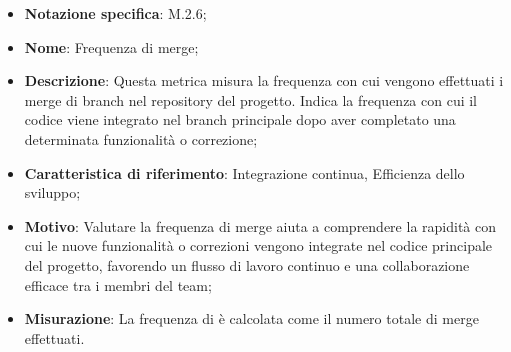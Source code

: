 \begin{itemize}
    \item \textbf{Notazione specifica}: M.2.6;
    \item \textbf{Nome}: Frequenza di merge;
    \item \textbf{Descrizione}: Questa metrica misura la frequenza con cui vengono effettuati i merge di branch nel repository del progetto. Indica la frequenza con cui il codice viene integrato nel branch principale dopo aver completato una determinata funzionalità o correzione;
    \item \textbf{Caratteristica di riferimento}: Integrazione continua, Efficienza dello sviluppo;
    \item \textbf{Motivo}: Valutare la frequenza di merge aiuta a comprendere la rapidità con cui le nuove funzionalità o correzioni vengono integrate nel codice principale del progetto, favorendo un flusso di lavoro continuo e una collaborazione efficace tra i membri del team;
    \item \textbf{Misurazione}: La frequenza di  è calcolata come il numero totale di merge effettuati.
   
   
   
\end{itemize}
